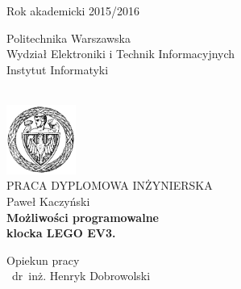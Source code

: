 \begin{titlepage}
    \begin{center}

        \begin{flushright}
            \begin{minipage}{0.35\textwidth}
                Rok akademicki 2015/2016
            \end{minipage}
        \end{flushright}

        \begin{flushleft}
            \begin{minipage}{0.57\textwidth}
                \begin{center}
                    \small
                    Politechnika Warszawska \\
                    Wydział Elektroniki i Technik Informacyjnych \\
                    Instytut Informatyki
                \end{center}
            \end{minipage}
        \end{flushleft}

        ~\\[2.0cm]

        \includegraphics[width=0.17\textwidth]{tytulowa_res/logo_pw.png}~\\[0.3cm]

        \Large PRACA DYPLOMOWA INŻYNIERSKA\\[0.5cm]

        \large Paweł Kaczyński \\[0.5cm]

        \LARGE \textbf{Możliwości programowalne\\klocka LEGO EV3.}

        \vfill

        \begin{flushright}
            \begin{minipage}{0.5\textwidth}
                \begin{center} \normalsize
                    Opiekun pracy\\
                    ~dr~inż. Henryk Dobrowolski
                \end{center}
            \end{minipage}
        \end{flushright}


\end{center}
\end{titlepage}
